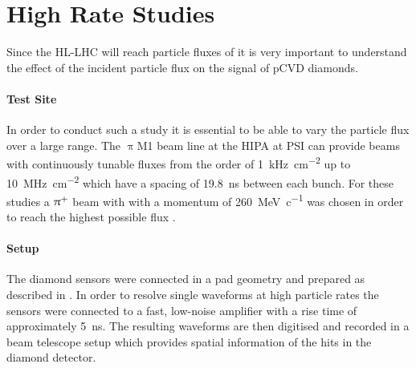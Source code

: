 \section{High Rate Studies}
Since the \ac{HL-LHC} will reach particle fluxes of  it is very important to understand the effect of the incident particle flux on the signal of \ac{pCVD} diamonds.
\paragraph{Test Site}
In order to conduct such a study it is essential to be able to vary the particle flux over a large range. The $\uppi$M1 beam line at the \ac{HIPA} at \ac{PSI} \cite{hipa} can provide beams with continuously tunable fluxes from the order of \SI{1}{\kilo\hertz\per\centi\meter^2} up to \SI{10}{\mega\hertz\per\centi\meter^2} which have a spacing of \SI{19.8}{\nano\second} between each bunch. For these studies a $\uppi^{\text{+}}$ beam with with a momentum of \SI{260}{\mega\electronvolt\per c}  was chosen in order to reach the highest possible flux \cite{pim1}.\par
\paragraph{Setup}
The diamond sensors were connected in a pad geometry and prepared as described in \cite{rainer}. 
In order to resolve single waveforms at high particle rates the sensors were connected to a fast, low-noise amplifier with a rise time of approximately \SI{5}{\nano\second}. The resulting waveforms are then digitised and recorded in a beam telescope setup which provides spatial information of the hits in the diamond detector.\par
